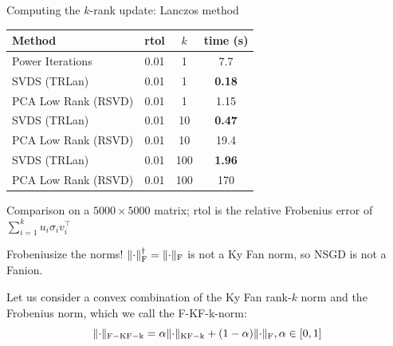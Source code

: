 \documentclass[aspectratio=169]{beamer}
\newcommand{\norm}[1]{\lVert #1\rVert}
\DeclarePairedDelimiter{\normf}{\|}{\|_\mathrm{F}}
\DeclarePairedDelimiter{\normkfk}{\|}{\|_\mathrm{KF-k}}
\begin{document}
\begin{frame}{Computing the $k$-rank update: Lanczos method}
    \begin{center}
    \small
    \begin{tabular}{lccc}
      \toprule
      Method & rtol & $k$ & time (s) \\
      \midrule
      Power Iterations & 0.01 & 1 & 7.7 \\
      SVDS (TRLan) & 0.01 & 1 & \textbf{0.18} \\
      PCA Low Rank (RSVD) & 0.01 & 1 & 1.15 \\
      SVDS (TRLan) & 0.01 & 10 & \textbf{0.47} \\
      PCA Low Rank (RSVD) & 0.01 & 10 & 19.4 \\
      SVDS (TRLan) & 0.01 & 100 & \textbf{1.96} \\
      PCA Low Rank (RSVD) & 0.01 & 100 & 170 \\
      \bottomrule
    \end{tabular}
    \end{center}
    \vspace{0.4em}
    \centering
    \footnotesize Comparison on a \(5000\times5000\) matrix; rtol is the relative Frobenius error of $\sum_{i=1}^{k}u_i \sigma_i v_i^\top$
  \end{frame}
\begin{frame}{Frobeniusize the norms!}
\faExclamationCircle \space $\normf{\cdot}^\dagger = \normf{\cdot}$ is not a Ky Fan norm, so NSGD is not a Fanion.
\vspace{1em}

Let us consider a convex combination of the Ky Fan rank-$k$ norm and the Frobenius norm, which we call the F-KF-k-norm: $$\norm{\cdot}_{\mathrm{F-KF-k}} = \alpha \normkfk{\cdot} + (1-\alpha)\normf{\cdot}, \alpha \in [0,1]$$

\end{frame}
\end{document}

